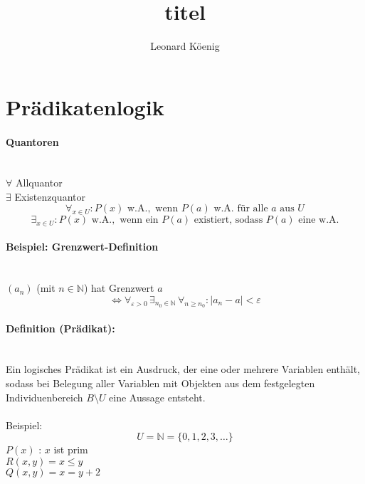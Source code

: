 \documentclass[10pt,a4paper]{article}
\author{Leonard K\"oenig}
\title{titel}
\begin{document}
\section{Pr\"adikatenlogik}
\paragraph{Quantoren}
\ \\$ \forall $ Allquantor \\
$ \exists $ Existenzquantor \\

\[
\forall_{x\in U}:P(x) \text{ w.A.},\text{ wenn }P(a) \text{ w.A. f\"ur alle } a \text{ aus } U
\]
\[
\exists_{x\in U}:P(x) \text{ w.A.},\text{ wenn ein }P(a) \text{ existiert, sodass } P(a) \text{ eine w.A.}
\]

\paragraph{Beispiel: Grenzwert-Definition}
\ \\
$(a_n)$ (mit $n\in \mathbb{N}$) hat Grenzwert $a$
\[
\Leftrightarrow \forall_{\varepsilon > 0} \, \exists_{n_0 \in \mathbb{N}} \, \forall_{n \geq n_0}: |a_n - a| < \varepsilon
\]

\paragraph{Definition (Pr\"adikat):}
\ \\
\glqq Ein logisches Pr\"adikat ist ein Ausdruck, der eine oder mehrere Variablen enth\"alt, sodass bei Belegung aller Variablen mit Objekten aus dem festgelegten Individuenbereich $B\setminus U$ eine Aussage entsteht.\grqq \\
\ \\
Beispiel:\\
\[
U=\mathbb{N}=\{0,1,2,3,\ldots\}
\]
$P(x)$ : \glq $x$ ist prim\grq \\
$R(x,y) = $\glq$x \leq y$\grq \\
$Q(x,y) = $\glq$x=y+2$\grq
\end{document}
